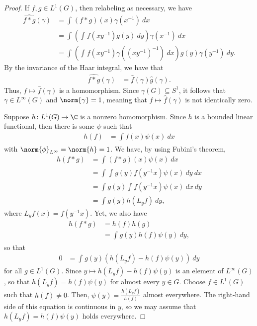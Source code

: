 \documentclass[10pt]{mypackage}
\begin{document}
\begin{proof}
  If $f,g\in L^1\left( G \right)$, then relabeling as necessary, we have
  \begin{align*}
    \widehat{f\ast g}(\gamma) &= \int_{}^{} \left( f\ast g \right)(x)\gamma\left( x^{-1} \right)\:dx\\
                              &= \int_{}^{} \left( \int_{}^{} f\left( xy^{-1} \right)g(y)\:dy \right)\gamma\left( x^{-1} \right)\:dx\\
                              &= \int_{}^{} \left( \int_{}^{} f\left( xy^{-1} \right)\gamma\left( \left( xy^{-1} \right)^{-1} \right)\:dx \right)g(y)\gamma\left( y^{-1} \right)\:dy.
  \end{align*}
  By the invariance of the Haar integral, we have that
  \begin{align*}
  \widehat{ f\ast g }(\gamma) &= \hat{f}(\gamma)\hat{g}(\gamma).
  \end{align*}
  Thus, $f\mapsto \hat{f}(\gamma)$ is a homomorphism. Since $\gamma(G)\subseteq S^1$, it follows that $\gamma\in L^{\infty}\left( G \right)$ and $\norm{\gamma} = 1$, meaning that $f\mapsto \hat{f}(\gamma)$ is not identically zero.

  Suppose $h\colon L^1(G)\to \C$ is a nonzero homomorphism. Since $h$ is a bounded linear functional, then there is some $\psi$ such that
  \begin{align*}
    h(f) &= \int_{}^{} f(x)\psi(x)\:dx 
  \end{align*}
  with $\norm{\phi}_{L^{\infty}} = \norm{h} = 1$. We have, by using Fubini's theorem,
  \begin{align*}
    h\left( f\ast g \right) &= \int_{}^{} \left( f\ast g \right)(x)\psi(x)\:dx\\
                            &= \int_{}^{} \int_{}^{} g(y)f\left( y^{-1}x \right)\psi(x)\:dy\:dx\\
                            &= \int_{}^{} g(y)\int_{}^{} f\left( y^{-1}x \right)\psi(x)\:dx\:dy\\
                            &= \int_{}^{} g(y)h\left( L_yf \right)\:dy,
  \end{align*}
  where $L_yf(x) = f\left( y^{-1}x \right)$. Yet, we also have
  \begin{align*}
    h\left( f\ast g \right) &= h(f)h(g)\\
                            &= \int_{}^{} g(y)h(f)\psi(y)\:dy,
  \end{align*}
  so that
  \begin{align*}
    0 &= \int_{}^{} g(y)\left( h\left( L_yf \right)-h(f)\psi(y) \right)\:dy
  \end{align*}
  for all $g\in L^1(G)$. Since $y\mapsto h\left( L_yf \right)-h(f)\psi(y)$ is an element of $L^{\infty}(G)$, so that $h\left( L_yf \right) = h(f)\psi(y)$ for almost every $y\in G$. Choose $f\in L^1(G)$ such that $h(f)\neq 0$. Then, $\psi(y) = \frac{h\left( L_yf \right)}{h(f)}$ almost everywhere. The right-hand side of this equation is continuous in $y$, so we may assume that $h\left( L_yf \right) = h(f)\psi(y)$ holds everywhere.
\end{proof}
\end{document}

